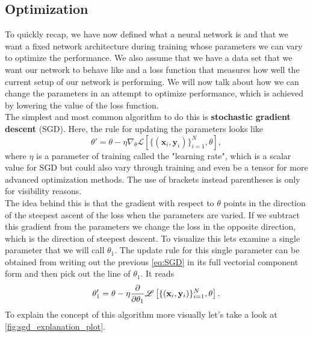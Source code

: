\subsection{Optimization}\label{sec:NetworkOptimization}
To quickly recap, we have now defined what a neural network is and that we want a fixed network architecture during training whose parameters we can vary to optimize the performance. We also assume that we have a data set that we want our network to behave like and a loss function that measures how well the current setup of our network is performing. We will now talk about how we can change the parameters in an attempt to optimize performance, which is achieved by lowering the value of the loss function.\\
The simplest and most common algorithm to do this is \textbf{stochastic gradient descent} (SGD). Here, the rule for updating the parameters looks like 
\begin{equation}\label{eq:SGD}
	\theta' = \theta - \eta \nabla_\theta \mathscr{L}\left[ \{(\mathbf{x}_i, \mathbf{y}_i)\}_{i=1}^{N}, \theta \right],
\end{equation}
where $\eta$ is a parameter of training called the "learning rate", which is a scalar value for SGD but could also vary through training and even be a tensor for more advanced optimization methods. The use of brackets instead parentheses is only for visibility reasons.\\
The idea behind this is that the gradient with respect to $\theta$ points in the direction of the steepest ascent of the loss when the parameters are varied. If we subtract this gradient from the parameters we change the loss in the opposite direction, which is the direction of steepest descent. To visualize this lets examine a single parameter that we will call $\theta_1$. The update rule for this single parameter can be obtained from writing out the previous \cref{eq:SGD} in its full vectorial component form and then pick out the line of $\theta_1$. It reads
\begin{equation}
	\theta_1' = \theta - \eta \frac{\partial}{\partial\theta_1} \mathscr{L}\left[ \{(\mathbf{x}_i, \mathbf{y}_i)\}_{i=1}^{N}, \theta \right].
\end{equation}
To explain the concept of this algorithm more visually let's take a look at \cref{fig:sgd_explanation_plot}. 
